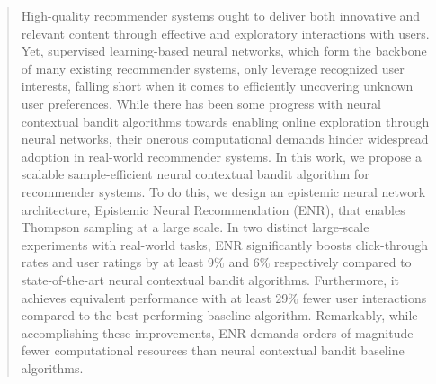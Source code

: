 \documentclass[sigconf,arxiv]{acmart}
\begin{document}
\begin{abstract}
High-quality recommender systems ought to deliver both innovative and relevant content through effective and exploratory interactions with users. Yet, supervised learning-based neural networks, which form the backbone of many existing recommender systems, only leverage recognized user interests, falling short when it comes to efficiently uncovering unknown user preferences. While there has been some progress with neural contextual bandit algorithms towards enabling online exploration through neural networks, their onerous computational demands hinder widespread adoption in real-world recommender systems. In this work, we propose a scalable sample-efficient neural contextual bandit algorithm for recommender systems. To do this, we design an epistemic neural network architecture, Epistemic Neural Recommendation (ENR), that enables Thompson sampling at a large scale.
In two distinct large-scale experiments with real-world tasks, ENR significantly boosts click-through rates and user ratings by at least $9\%$ and $6\%$ respectively compared to state-of-the-art neural contextual bandit algorithms. Furthermore, it achieves equivalent performance with at least $29\%$ fewer user interactions compared to the best-performing baseline algorithm. Remarkably, while accomplishing these improvements, ENR demands orders of magnitude fewer computational resources than neural contextual bandit baseline algorithms.

\end{abstract}
\end{document}
